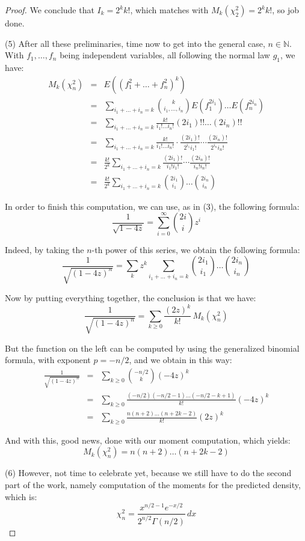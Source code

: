 \documentclass[12pt]{amsbook}
\begin{document}
\begin{proof}
We conclude that $I_k=2^kk!$, which matches with $M_k(\chi_2^2)=2^kk!$, so job done.

\medskip

(5) After all these preliminaries, time now to get into the general case, $n\in\mathbb N$. With $f_1,\ldots,f_n$ being independent variables, all following the normal law $g_1$, we have:
\begin{eqnarray*}
M_k(\chi_n^2)
&=&E((f_1^2+\ldots+f_n^2)^k)\\
&=&\sum_{i_1+\ldots+i_n=k}\binom{k}{i_1,\ldots,i_n}E(f_1^{2i_1})\ldots E(f_n^{2i_n})\\
&=&\sum_{i_1+\ldots+i_n=k}\frac{k!}{i_1!\ldots i_n!}(2i_1)!!\ldots(2i_n)!!\\
&=&\sum_{i_1+\ldots+i_n=k}\frac{k!}{i_1!\ldots i_n!}\cdot\frac{(2i_1)!}{2^{i_1}i_1!}\cdots\frac{(2i_n)!}{2^{i_n}i_n!}\\
&=&\frac{k!}{2^k}\sum_{i_1+\ldots+i_n=k}\frac{(2i_1)!}{i_1!i_1!}\cdots\frac{(2i_n)!}{i_n!i_n!}\\
&=&\frac{k!}{2^k}\sum_{i_1+\ldots+i_n=k}\binom{2i_1}{i_1}\ldots\binom{2i_n}{i_n}
\end{eqnarray*}

In order to finish this computation, we can use, as in (3), the following formula:
$$\frac{1}{\sqrt{1-4z}}=\sum_{i=0}^\infty\binom{2i}{i}z^i$$

Indeed, by taking the $n$-th power of this series, we obtain the following formula:
$$\frac{1}{\sqrt{(1-4z)^n}}
=\sum_kz^k\sum_{i_1+\ldots+i_n=k}\binom{2i_1}{i_1}\ldots\binom{2i_n}{i_n}$$

Now by putting everything together, the conclusion is that we have:
$$\frac{1}{\sqrt{(1-4z)^n}}
=\sum_{k\geq0}\frac{(2z)^k}{k!}\,M_k(\chi_n^2)$$

But the function on the left can be computed by using the generalized binomial formula, with exponent $p=-n/2$, and we obtain in this way:
\begin{eqnarray*}
\frac{1}{\sqrt{(1-4z)^n}}
&=&\sum_{k\geq0}\binom{-n/2}{k}(-4z)^k\\
&=&\sum_{k\geq0}\frac{(-n/2)(-n/2-1)\ldots(-n/2-k+1)}{k!}(-4z)^k\\
&=&\sum_{k\geq0}\frac{n(n+2)\ldots(n+2k-2)}{k!}(2z)^k
\end{eqnarray*}

And with this, good news, done with our moment computation, which yields:
$$M_k(\chi_n^2)=n(n+2)\ldots(n+2k-2)$$

(6) However, not time to celebrate yet, because we still have to do the second part of the work, namely computation of the moments for the predicted density, which is:
$$\chi_n^2=\frac{x^{n/2-1}e^{-x/2}}{2^{n/2}\Gamma(n/2)}\,dx$$


\end{proof}
\end{document}

